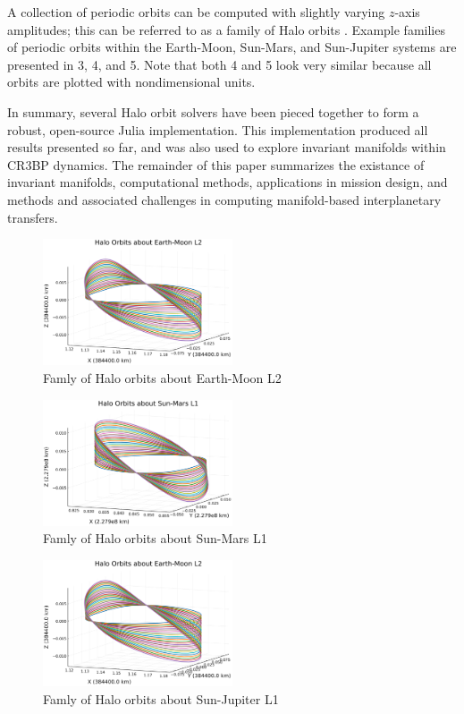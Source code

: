 \documentclass[conf]{new-aiaa}
\begin{document}
\begin{multicols*}{2}
A collection of periodic orbits can be computed with slightly varying 
$z$-axis amplitudes; this can be referred to as a family of Halo orbits
\cite{rund2018interplanetary}. 
Example families of periodic orbits within the Earth-Moon, Sun-Mars, 
and Sun-Jupiter systems are presented in \figurename{3}, \figurename{4},
and \figurename{5}. Note that both \figurename{4} and \figurename{5} 
look very similar because all orbits are plotted with nondimensional units.

In summary, several Halo orbit solvers have been pieced together to form 
a robust, open-source Julia implementation. This implementation produced 
all results presented so far, and was also used to explore invariant 
manifolds within CR3BP dynamics. The remainder of this paper summarizes
the existance of invariant manifolds, computational methods, 
applications in mission design, and methods and associated challenges 
in computing manifold-based interplanetary transfers. 

\begin{figure}[H]
    \hskip -0.3cm
    \includegraphics[width=0.5\textwidth]{halo_family.png}
    \caption{Famly of Halo orbits about Earth-Moon L2}
\end{figure}

\begin{figure}[H]
    \hskip -0.3cm
    \includegraphics[width=0.5\textwidth]{halo_family_sm1.png}
    \caption{Famly of Halo orbits about Sun-Mars L1}
\end{figure}

\begin{figure}[H]
    \hskip -0.3cm
    \includegraphics[width=0.5\textwidth]{halo_family_sj1.png}
    \caption{Famly of Halo orbits about Sun-Jupiter L1}
\end{figure}


\end{multicols*}
\end{document}
